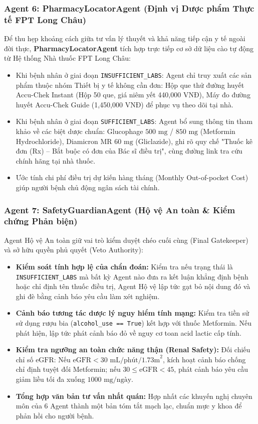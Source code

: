 \documentclass[12pt,a4paper]{article}
\begin{document}
\subsubsection{Agent 6: PharmacyLocatorAgent (Định vị Dược phẩm Thực tế FPT Long Châu)}
Để thu hẹp khoảng cách giữa tư vấn lý thuyết và khả năng tiếp cận y tế ngoài đời thực, \textbf{PharmacyLocatorAgent} tích hợp trực tiếp cơ sở dữ liệu cào tự động từ Hệ thống Nhà thuốc FPT Long Châu:
\begin{itemize}[leftmargin=1.2cm]
    \item Khi bệnh nhân ở giai đoạn \texttt{INSUFFICIENT\_LABS}: Agent chỉ truy xuất các sản phẩm thuộc nhóm Thiết bị y tế không cần đơn: Hộp que thử đường huyết Accu-Chek Instant (Hộp 50 que, giá niêm yết 440,000 VNĐ), Máy đo đường huyết Accu-Chek Guide (1,450,000 VNĐ) để phục vụ theo dõi tại nhà.
    \item Khi bệnh nhân ở giai đoạn \texttt{SUFFICIENT\_LABS}: Agent bổ sung thông tin tham khảo về các biệt dược chuẩn: Glucophage $500\text{ mg}$ / $850\text{ mg}$ (Metformin Hydrochloride), Diamicron MR $60\text{ mg}$ (Gliclazide), ghi rõ quy chế "Thuốc kê đơn (Rx) -- Bắt buộc có đơn của Bác sĩ điều trị", cùng đường link tra cứu chính hãng tại nhà thuốc.
    \item Ước tính chi phí điều trị dự kiến hàng tháng (Monthly Out-of-pocket Cost) giúp người bệnh chủ động ngân sách tài chính.
\end{itemize}

\subsubsection{Agent 7: SafetyGuardianAgent (Hộ vệ An toàn \& Kiểm chứng Phản biện)}
Agent Hộ vệ An toàn giữ vai trò kiểm duyệt chéo cuối cùng (Final Gatekeeper) và sở hữu quyền phủ quyết (Veto Authority):
\begin{itemize}[leftmargin=1.2cm]
    \item \textbf{Kiểm soát tính hợp lệ của chẩn đoán:} Kiểm tra nếu trạng thái là \texttt{INSUFFICIENT\_LABS} mà bất kỳ Agent nào đưa ra kết luận khẳng định bệnh hoặc chỉ định tên thuốc điều trị, Agent Hộ vệ lập tức gạt bỏ nội dung đó và ghi đè bằng cảnh báo yêu cầu làm xét nghiệm.
    \item \textbf{Cảnh báo tương tác dược lý nguy hiểm tính mạng:} Kiểm tra tiền sử sử dụng rượu bia (\texttt{alcohol\_use == True}) kết hợp với thuốc Metformin. Nếu phát hiện, lập tức phát cảnh báo đỏ về nguy cơ toan acid lactic cấp tính.
    \item \textbf{Kiểm tra ngưỡng an toàn chức năng thận (Renal Safety):} Đối chiếu chỉ số $\text{eGFR}$: Nếu $\text{eGFR} < 30\text{ mL/phút/1.73m}^2$, kích hoạt cảnh báo chống chỉ định tuyệt đối Metformin; nếu $30 \le \text{eGFR} < 45$, phát cảnh báo yêu cầu giảm liều tối đa xuống $1000\text{ mg/ngày}$.
    \item \textbf{Tổng hợp văn bản tư vấn nhất quán:} Hợp nhất các khuyến nghị chuyên môn của 6 Agent thành một bản tóm tắt mạch lạc, chuẩn mực y khoa để phản hồi cho người bệnh.
\end{itemize}
\end{document}
